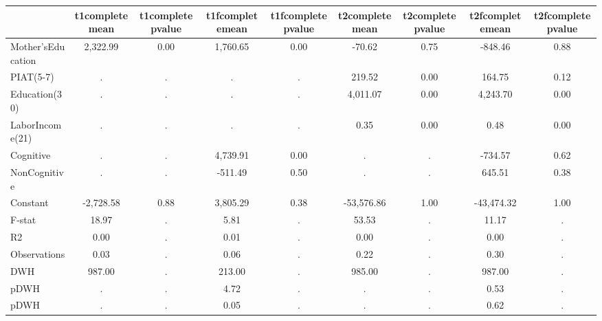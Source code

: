 \begin{table}[htbp]
\begin{tabular}{lcccccccc} \hline \hline
 & t1completemean  & t1completepvalue  & t1fcompletemean  & t1fcompletepvalue  & t2completemean  & t2completepvalue  & t2fcompletemean  & t2fcompletepvalue  \\  \hline 
Mother'sEducation &     2,322.99 &         0.00 &     1,760.65 &         0.00 &       -70.62 &         0.75 &      -848.46 &         0.88 \\  
PIAT(5-7) &            . &            . &            . &            . &       219.52 &         0.00 &       164.75 &         0.12 \\  
Education(30) &            . &            . &            . &            . &     4,011.07 &         0.00 &     4,243.70 &         0.00 \\  
LaborIncome(21) &            . &            . &            . &            . &         0.35 &         0.00 &         0.48 &         0.00 \\  
Cognitive &            . &            . &     4,739.91 &         0.00 &            . &            . &      -734.57 &         0.62 \\  
NonCognitive &            . &            . &      -511.49 &         0.50 &            . &            . &       645.51 &         0.38 \\  
Constant &    -2,728.58 &         0.88 &     3,805.29 &         0.38 &   -53,576.86 &         1.00 &   -43,474.32 &         1.00 \\  
F-stat &        18.97 &            . &         5.81 &            . &        53.53 &            . &        11.17 &            . \\  
R2 &         0.00 &            . &         0.01 &            . &         0.00 &            . &         0.00 &            . \\  
Observations &         0.03 &            . &         0.06 &            . &         0.22 &            . &         0.30 &            . \\  
DWH &       987.00 &            . &       213.00 &            . &       985.00 &            . &       987.00 &            . \\  
pDWH &            . &            . &         4.72 &            . &            . &            . &         0.53 &            . \\  
pDWH &            . &            . &         0.05 &            . &            . &            . &         0.62 &            . \\  
\hline \hline \end{tabular}
\end{table}
